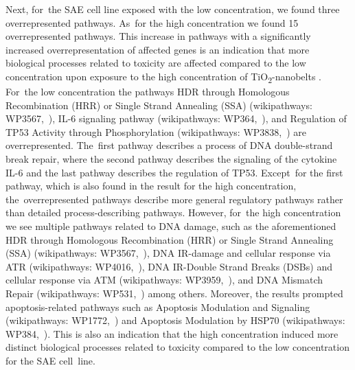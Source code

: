 \documentclass[ijms,article,accept,moreauthors,pdftex]{Definitions/mdpi}
\begin{document}
\begin{paracol}{2}
Next, for~the SAE cell line exposed with the low concentration, we found three overrepresented pathways. As~for the high concentration we found 15 overrepresented pathways. This increase in pathways with a significantly increased overrepresentation of affected genes is an indication that more biological processes related to toxicity are affected compared to the low concentration upon exposure to the high concentration of TiO\textsubscript{2}-nanobelts . For~the low concentration the pathways HDR through Homologous Recombination (HRR) or Single Strand Annealing (SSA) (wikipathways: WP3567,~\cite{WP3567}), IL-6 signaling pathway (wikipathways: WP364,~\cite{WP364}), and Regulation of TP53 Activity through Phosphorylation (wikipathways: WP3838,~\cite{WP3838}) are overrepresented. The~first pathway describes a process of DNA double-strand break repair, where the second pathway describes the signaling of the cytokine IL-6 and the last pathway describes the regulation of TP53. Except~for the first pathway, which is also found in the result for the high concentration, the~overrepresented pathways describe more general regulatory pathways rather than detailed process-describing pathways. However, for~the high concentration we see multiple pathways related to DNA damage, such as the aforementioned HDR through Homologous Recombination (HRR) or Single Strand Annealing (SSA) (wikipathways: WP3567,~\cite{WP3567}), DNA IR-damage and cellular response via ATR (wikipathways: WP4016,~\cite{WP4016}), DNA IR-Double Strand Breaks (DSBs) and cellular response via ATM (wikipathways: WP3959,~\cite{WP3959}), and DNA Mismatch Repair (wikipathways: WP531,~\cite{WP531}) among others. Moreover, the results prompted apoptosis-related pathways such as Apoptosis Modulation and Signaling (wikipathways: WP1772,~\cite{WP1772}) and Apoptosis Modulation by HSP70 (wikipathways: WP384,~\cite{WP384}). This is also an indication that the high concentration induced more distinct biological processes related to toxicity compared to the low concentration for the SAE cell~line. 


\end{paracol}
\end{document}
